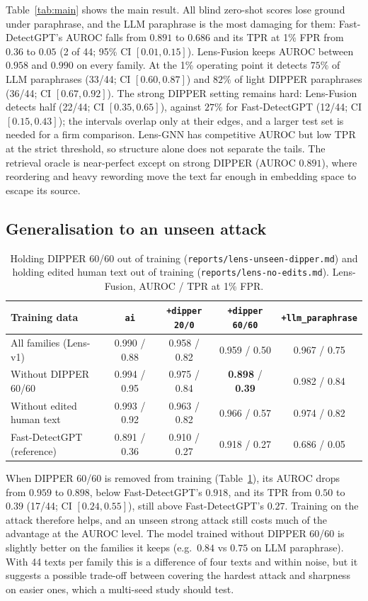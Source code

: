 \documentclass[11pt]{article}
\newcommand{\fy}[1]{\texttt{#1}}
\begin{document}
Table~\ref{tab:main} shows the main result.
All blind zero-shot scores lose ground under paraphrase, and the LLM paraphrase is the most damaging for them: Fast-DetectGPT's AUROC falls from $0.891$ to $0.686$ and its TPR at 1\% FPR from $0.36$ to $0.05$ (2 of 44; 95\% CI $[0.01, 0.15]$).
Lens-Fusion keeps AUROC between $0.958$ and $0.990$ on every family.
At the 1\% operating point it detects $75\%$ of LLM paraphrases (33/44; CI $[0.60, 0.87]$) and $82\%$ of light DIPPER paraphrases (36/44; CI $[0.67, 0.92]$).
The strong DIPPER setting remains hard: Lens-Fusion detects half (22/44; CI $[0.35, 0.65]$), against $27\%$ for Fast-DetectGPT (12/44; CI $[0.15, 0.43]$); the intervals overlap only at their edges, and a larger test set is needed for a firm comparison.
Lens-GNN has competitive AUROC but low TPR at the strict threshold, so structure alone does not separate the tails.
The retrieval oracle is near-perfect except on strong DIPPER (AUROC $0.891$), where reordering and heavy rewording move the text far enough in embedding space to escape its source.

\subsection{Generalisation to an unseen attack}

\begin{table}[t]
\centering
\caption{Holding DIPPER 60/60 out of training (\texttt{reports/lens-unseen-dipper.md}) and holding edited human text out of training (\texttt{reports/lens-no-edits.md}). Lens-Fusion, AUROC / TPR at 1\% FPR.}
\label{tab:ablation}
\small
\begin{tabular}{lcccc}
\toprule
Training data & \fy{ai} & \fy{+dipper 20/0} & \fy{+dipper 60/60} & \fy{+llm\_paraphrase} \\
\midrule
All families (Lens-v1) & 0.990 / 0.88 & 0.958 / 0.82 & 0.959 / 0.50 & 0.967 / 0.75 \\
Without DIPPER 60/60 & 0.994 / 0.95 & 0.975 / 0.84 & \textbf{0.898} / \textbf{0.39} & 0.982 / 0.84 \\
Without edited human text & 0.993 / 0.92 & 0.963 / 0.82 & 0.966 / 0.57 & 0.974 / 0.82 \\
\midrule
Fast-DetectGPT (reference) & 0.891 / 0.36 & 0.910 / 0.27 & 0.918 / 0.27 & 0.686 / 0.05 \\
\bottomrule
\end{tabular}
\end{table}

When DIPPER 60/60 is removed from training (Table~\ref{tab:ablation}), its AUROC drops from $0.959$ to $0.898$, below Fast-DetectGPT's $0.918$, and its TPR from $0.50$ to $0.39$ (17/44; CI $[0.24, 0.55]$), still above Fast-DetectGPT's $0.27$.
Training on the attack therefore helps, and an unseen strong attack still costs much of the advantage at the AUROC level.
The model trained without DIPPER 60/60 is slightly better on the families it keeps (e.g.\ $0.84$ vs $0.75$ on LLM paraphrase).
With 44 texts per family this is a difference of four texts and within noise, but it suggests a possible trade-off between covering the hardest attack and sharpness on easier ones, which a multi-seed study should test.
\end{document}
